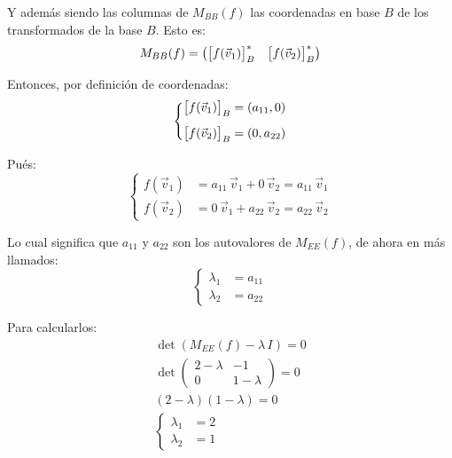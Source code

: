 \documentclass[a5paper,12pt,twoside]{book}
\begin{document}
\begin{mdframed}[style=ExampleFrame]
    Y además siendo las columnas de $M_{BB}(f)$ las coordenadas en base $B$ de los transformados de la base $B$.
    Esto es:
    \begin{equation*}
        M_{BB}(f) =
        \begin{pmatrix}
            { \begin{bmatrix} f(\Vec{v}_1) \end{bmatrix} }_B^* & { \begin{bmatrix} f(\Vec{v}_2) \end{bmatrix} }_B^*
        \end{pmatrix}
    \end{equation*}
    
    Entonces, por definición de coordenadas:
    \begin{equation*}
        \left\{
        \begin{aligned}
            { \begin{bmatrix} f(\Vec{v}_1) \end{bmatrix} }_B &= (a_{11} , 0)
            \\[1ex]
            { \begin{bmatrix} f(\Vec{v}_2) \end{bmatrix} }_B &= (0 , a_{22})
        \end{aligned}
        \right.
    \end{equation*}
    
    Pués:
    \begin{equation*}
        \left\{
        \begin{aligned}
            f(\Vec{v}_1) &= a_{11} \, \Vec{v}_1 + 0 \, \Vec{v}_2 = a_{11} \, \Vec{v}_1
            \\
            f(\Vec{v}_2) &= 0 \, \Vec{v}_1 + a_{22} \, \Vec{v}_2 = a_{22} \, \Vec{v}_2
        \end{aligned}
        \right.
    \end{equation*}
    
    Lo cual significa que $a_{11}$ y $a_{22}$ son los autovalores de $M_{EE}(f)$, de ahora en más llamados:
    \begin{equation*}
        \left\{
        \begin{aligned}
        \lambda_1 &= a_{11}
        \\
        \lambda_2 &= a_{22}
        \end{aligned}
        \right.
    \end{equation*}
    
    Para calcularlos:
    \begin{gather*}
        \operatorname{det} \left( M_{EE}(f) - \lambda \, I \right) = 0
        \\[1ex]
        \operatorname{det}
        \begin{pmatrix}
            2-\lambda & -1
            \\
            0 & 1-\lambda
        \end{pmatrix}
        = 0
        \\[1ex]
        \left( 2-\lambda \right) \left( 1-\lambda \right) = 0
        \\[1ex]
        \left\{
        \begin{aligned}
        \lambda_1 &= 2
        \\
        \lambda_2 &= 1
        \end{aligned}
        \right.
    \end{gather*}
    

\end{mdframed}
\end{document}
